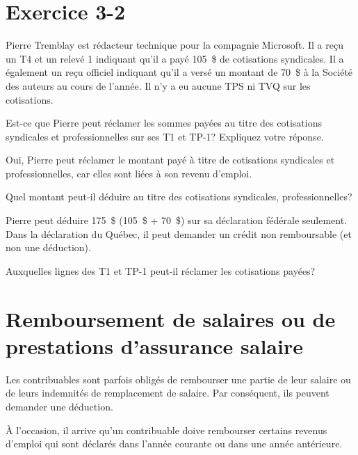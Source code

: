 


\section{Exercice 3-2}
\setcounter{question}{0}
\begin{question}
	Pierre Tremblay est rédacteur technique pour la compagnie Microsoft. Il a reçu un T4 et un relevé 1 indiquant qu'il a payé 105~\$ de cotisations syndicales. Il a également un reçu officiel indiquant qu'il a versé un montant de 70~\$ à la Société des auteurs au cours de l'année. Il n'y a eu aucune TPS ni TVQ sur les cotisations.
\end{question}

\setcounter{sousQuestion}{0}
\begin{sousQuestion}
	Est-ce que Pierre peut réclamer les sommes payées au titre des cotisations syndicales et professionnelles sur ses T1 et TP-1? Expliquez votre réponse.
\end{sousQuestion}
Oui, Pierre peut réclamer le montant payé à titre de cotisations syndicales et professionnelles, car elles sont liées à son revenu d'emploi.

\begin{sousQuestion}
	Quel montant peut-il déduire au titre des cotisations syndicales, professionnelles? 
\end{sousQuestion}
Pierre peut déduire 175~\$ (105~\$ + 70~\$) sur sa déclaration fédérale seulement. Dans la déclaration du Québec, il peut demander un crédit non remboursable (et non une déduction).

\begin{sousQuestion}
	Auxquelles lignes des T1 et TP-1 peut-il réclamer les cotisations payées?
\end{sousQuestion}



\section{Remboursement de salaires ou de prestations d'assurance salaire}
\begin{intro}
	Les contribuables sont parfois obligés de rembourser une partie de leur salaire ou de leurs indemnités de remplacement de salaire. Par conséquent, ils peuvent demander une déduction.
\end{intro}

À l'occasion, il arrive qu'un contribuable doive rembourser certains revenus d'emploi qui sont déclarés dans l'année courante ou dans une année antérieure. 

